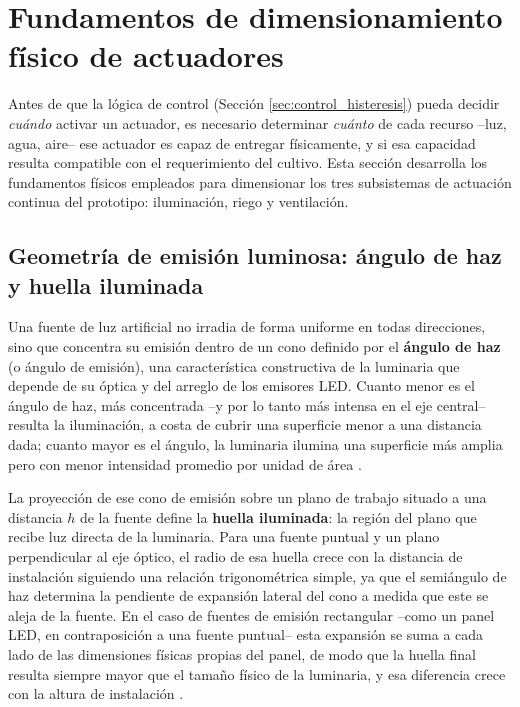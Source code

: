 \section{Fundamentos de dimensionamiento físico de actuadores}
\label{sec:dimensionamiento_fisico}

Antes de que la lógica de control (Sección \ref{sec:control_histeresis}) pueda decidir \textit{cuándo} activar un actuador, es necesario determinar \textit{cuánto} de cada recurso --luz, agua, aire-- ese actuador es capaz de entregar físicamente, y si esa capacidad resulta compatible con el requerimiento del cultivo. Esta sección desarrolla los fundamentos físicos empleados para dimensionar los tres subsistemas de actuación continua del prototipo: iluminación, riego y ventilación.

\subsection{Geometría de emisión luminosa: ángulo de haz y huella iluminada}
\label{subsec:geometria_luminica}

Una fuente de luz artificial no irradia de forma uniforme en todas direcciones, sino que concentra su emisión dentro de un cono definido por el \textbf{ángulo de haz} (o ángulo de emisión), una característica constructiva de la luminaria que depende de su óptica y del arreglo de los emisores LED. Cuanto menor es el ángulo de haz, más concentrada --y por lo tanto más intensa en el eje central-- resulta la iluminación, a costa de cubrir una superficie menor a una distancia dada; cuanto mayor es el ángulo, la luminaria ilumina una superficie más amplia pero con menor intensidad promedio por unidad de área \cite{dilaura2011ies}.

La proyección de ese cono de emisión sobre un plano de trabajo situado a una distancia $h$ de la fuente define la \textbf{huella iluminada}: la región del plano que recibe luz directa de la luminaria. Para una fuente puntual y un plano perpendicular al eje óptico, el radio de esa huella crece con la distancia de instalación siguiendo una relación trigonométrica simple, ya que el semiángulo de haz determina la pendiente de expansión lateral del cono a medida que este se aleja de la fuente. En el caso de fuentes de emisión rectangular --como un panel LED, en contraposición a una fuente puntual-- esta expansión se suma a cada lado de las dimensiones físicas propias del panel, de modo que la huella final resulta siempre mayor que el tamaño físico de la luminaria, y esa diferencia crece con la altura de instalación \cite{coaton1997lamps}.

